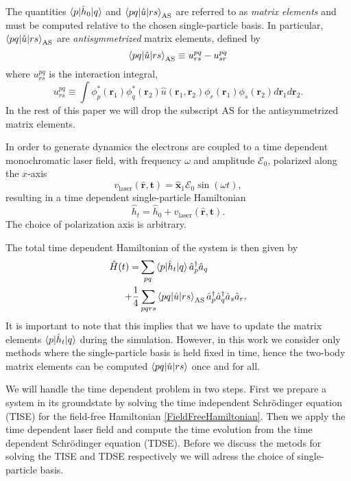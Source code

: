 \documentclass[aip,jcp,reprint,floatfix]{revtex4-1}
\begin{document}
The quantities $\braket{p|\hat{h}_0|q}$ and
$\braket{pq|\hat{u}|rs}_{\text{AS}}$ are referred to as \textit{matrix
  elements} and must be computed relative to the chosen
single-particle basis. In particular,
$\braket{pq|\hat{u}|rs}_{\text{AS}}$ are \textit{antisymmetrized}
matrix elements, defined by
\begin{equation}
 \braket{pq|\hat{u}|rs}_{\text{AS}} \equiv u^{pq}_{rs} - u^{pq}_{sr}
\end{equation}
where $u^{pq}_{rs}$ is the interaction integral, 
\begin{equation}
 u^{pq}_{rs} \equiv \int \phi^*_p(\mathbf{r}_1) \phi^*_q(\mathbf{r}_2) \hat{u}(\mathbf{r}_1,\mathbf{r}_2) \phi_r(\mathbf{r}_1)\phi_s(\mathbf{r}_2) d\mathbf{r}_1 d\mathbf{r}_2.
\end{equation}
In the rest of this paper we will drop the subscript AS for the
antisymmetrized matrix elements.

In order to generate dynamics the electrons are coupled to a time
dependent monochromatic laser field, with frequency $\omega$ and
amplitude $\mathcal{E}_0$, polarized along the $x$-axis
\cite{Zanghellini04}
\begin{equation}
 v_{\text{laser}}(\mathbf{\hat{r},t}) = \hat{\mathbf{x}}_1 \mathcal{E}_0 \sin(\omega t),
\end{equation}
resulting in a time dependent single-particle Hamiltonian
\begin{equation}
 \hat{h}_t = \hat{h}_0 + v_{\text{laser}}(\mathbf{\hat{r},t}).
\end{equation}
The choice of polarization axis is arbitrary. 

The total time dependent Hamiltonian of the system is then given by
\begin{align}
 \hat{H}(t) = &\sum_{pq} \braket{p|\hat{h}_t|q}\hat{a}_p^\dagger\hat{a}_q \nonumber \\
 + \frac{1}{4}&\sum_{pqrs}\braket{pq|\hat{u}|rs}_{\text{AS}}\hat{a}_p^\dagger\hat{a}_q^\dagger\hat{a}_s\hat{a}_r.
\end{align}
It is important to note that this implies that we have to update the
matrix elements $\braket{p|\hat{h}_t|q}$ during the
simulation. However, in this work we consider only methods where the
single-particle basis is held fixed in time, hence the two-body matrix
elements can be computed $\braket{pq|\hat{u}|rs}$ once and for all.

We will handle the time dependent problem in two steps. First we
prepare a system in its groundstate by solving the time independent
Schrödinger equation (TISE) for the field-free Hamiltonian
\eqref{FieldFreeHamiltonian}.  Then we apply the time dependent laser
field and compute the time evolution from the time dependent
Schrödinger equation (TDSE).  Before we discuss the metods for solving
the TISE and TDSE respectively we will adress the choice of
single-particle basis.
\end{document}
